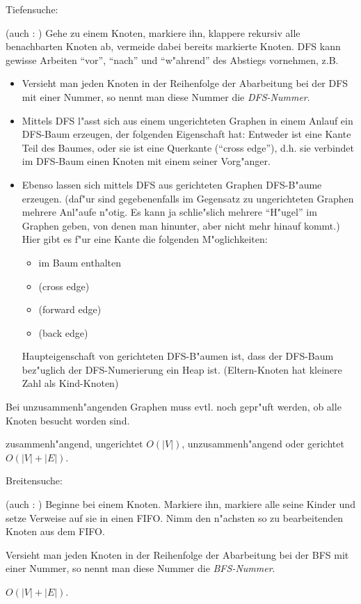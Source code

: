 \algorithm Tiefensuche:{
  (auch : )
  Gehe zu einem Knoten, markiere ihn, klappere rekursiv alle benachbarten 
  Knoten ab, vermeide dabei bereits markierte Knoten. DFS kann gewisse
  Arbeiten ``vor'', ``nach'' und ``w"ahrend'' des Abstiegs vornehmen, z.B.

  \begin{itemize}
  \item
    Versieht man jeden Knoten in der Reihenfolge der Abarbeitung bei der
    DFS mit einer Nummer, so nennt man diese Nummer die \textit{DFS-Nummer}.
  \item
    Mittels DFS l"asst sich aus einem ungerichteten Graphen in einem
    Anlauf ein DFS-Baum erzeugen, der folgenden Eigenschaft hat: Entweder 
    ist eine Kante Teil des Baumes, oder sie ist eine Querkante (``cross edge''), 
    d.h. sie verbindet im DFS-Baum einen Knoten mit einem seiner Vorg"anger.
  \item
    Ebenso lassen sich mittels DFS aus gerichteten Graphen DFS-B"aume erzeugen.
    (daf"ur sind gegebenenfalls im Gegensatz zu ungerichteten Graphen mehrere
    Anl"aufe n"otig. Es kann ja schlie"slich mehrere ``H"ugel'' im Graphen
    geben, von denen man hinunter, aber nicht mehr hinauf kommt.)
    Hier gibt es f"ur eine Kante die folgenden M"oglichkeiten:
    \begin{itemize}
      \item im Baum enthalten
      \item {} (cross edge)
      \item {} (forward edge)
      \item {} (back edge)
    \end{itemize}
    Haupteigenschaft von gerichteten DFS-B"aumen ist, dass der DFS-Baum
    bez"uglich der DFS-Numerierung ein Heap ist. (Eltern-Knoten hat 
    kleinere Zahl als Kind-Knoten)
  \end{itemize}  
  
  Bei unzusammenh"angenden Graphen muss evtl. noch gepr"uft werden, ob alle
  Knoten besucht worden sind.

  \cpx zusammenh"angend, ungerichtet $O(|V|)$, 
    unzusammenh"angend oder gerichtet $O(|V|+|E|)$.
}
\algorithm Breitensuche:{
  (auch : )
  Beginne bei einem Knoten. Markiere ihn, markiere alle seine Kinder und setze 
  Verweise auf sie in einen FIFO. Nimm den n"achsten so zu bearbeitenden Knoten
  aus dem FIFO.

  Versieht man jeden Knoten in der Reihenfolge der Abarbeitung bei der
  BFS mit einer Nummer, so nennt man diese Nummer die \textit{BFS-Nummer}.
  
  \cpx $O(|V|+|E|)$.
}
